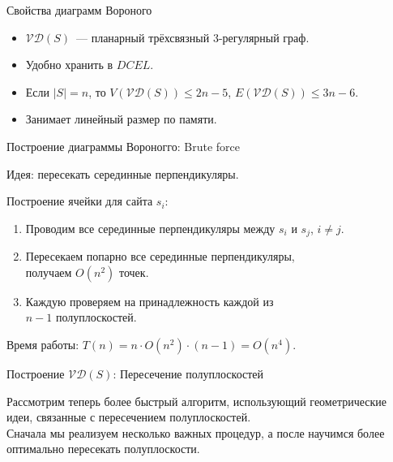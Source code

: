     \begin{frame}{Свойства диаграмм Вороного}

        \begin{itemize}

            \item $\mathcal{V}\mathcal{D}(S)$~--- планарный трёхсвязный 3-регулярный граф.

            \item Удобно хранить в $DCEL$.

            \item Если $|S| = n$, то $V(\mathcal{V}\mathcal{D}(S)) \le 2n - 5$, $E(\mathcal{V}\mathcal{D}(S)) \le 3n - 6$.

            \item Занимает линейный размер по памяти.

        \end{itemize}
    \end{frame}

    \begin{frame}{Построение диаграммы Вороногго: Brute force}

        \alert{Идея:} пересекать серединные перпендикуляры.

        Построение ячейки для сайта $s_i$:

        \begin{enumerate}
            \item Проводим все серединные перпендикуляры между $s_i$ и $s_j$, $i \neq j$.

            \item Пересекаем попарно все серединные перпендикуляры,\\ получаем $O(n^2)$ точек.

            \item Каждую проверяем на принадлежность каждой из\\ $n - 1$ полуплоскостей.

        \end{enumerate}

        Время работы: $T(n) = n \cdot O(n^2) \cdot (n - 1) = O(n^4)$.

    \end{frame}

    \begin{frame}{Построение $\mathcal{V}\mathcal{D}(S)$: Пересечение полуплоскостей}

        Рассмотрим теперь более быстрый алгоритм, использующий геометрические идеи, связанные с пересечением полуплоскостей. \\

        Сначала мы реализуем несколько важных процедур, а после научимся более оптимально пересекать полуплоскости.

    \end{frame}

